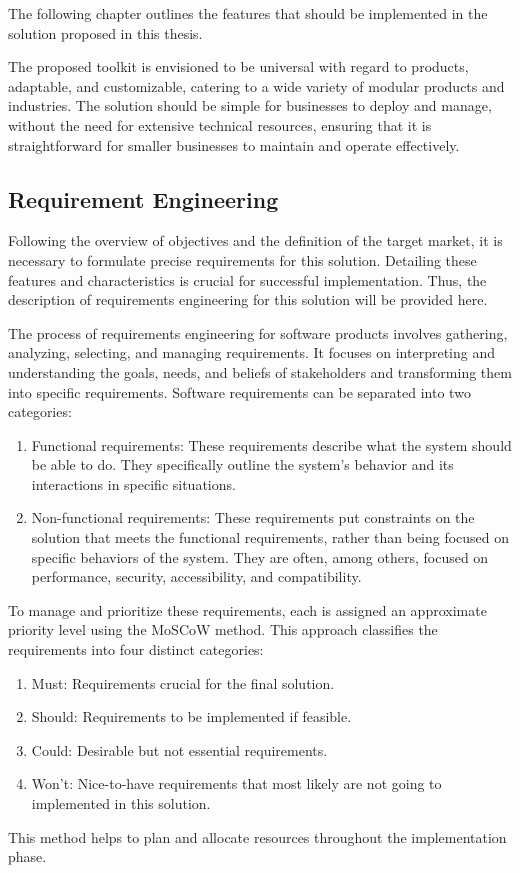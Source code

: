 The following chapter outlines the features that should be implemented in the solution proposed in this thesis.
 
The proposed toolkit is envisioned to be universal with regard to products, adaptable, and customizable, catering to a wide variety of modular products and industries. The solution should be simple for businesses to deploy and manage, without the need for extensive technical resources, ensuring that it is straightforward for smaller businesses to maintain and operate effectively.

\subsection{Requirement Engineering} \label{section:requirements}

Following the overview of objectives and the definition of the target market, it is necessary to formulate precise requirements for this solution. Detailing these features and characteristics is crucial for successful implementation. Thus, the description of requirements engineering for this solution will be provided here.

The process of requirements engineering for software products involves gathering, analyzing, selecting, and managing requirements. It focuses on interpreting and understanding the goals, needs, and beliefs of stakeholders and transforming them into specific requirements.
Software requirements can be separated into two categories: \cite{Aurum2005}
\begin{enumerate}
    \item Functional requirements: These requirements describe what the system should be able to do. They specifically outline the system's behavior and its interactions in specific situations.
    \item Non-functional requirements: These requirements put constraints on the solution that meets the functional requirements, rather than being focused on specific behaviors of the system. They are often, among others, focused on performance, security, accessibility, and compatibility.
\end{enumerate}

To manage and prioritize these requirements, each is assigned an approximate priority level using the MoSCoW method. This approach classifies the requirements into four distinct categories: \cite{Kravchenko2022}
\begin{enumerate}
    \item Must: Requirements crucial for the final solution.
    \item Should: Requirements to be implemented if feasible.
    \item Could: Desirable but not essential requirements.
    \item Won't: Nice-to-have requirements that most likely are not going to implemented in this solution.
\end{enumerate}
This method helps to plan and allocate resources throughout the implementation phase.

